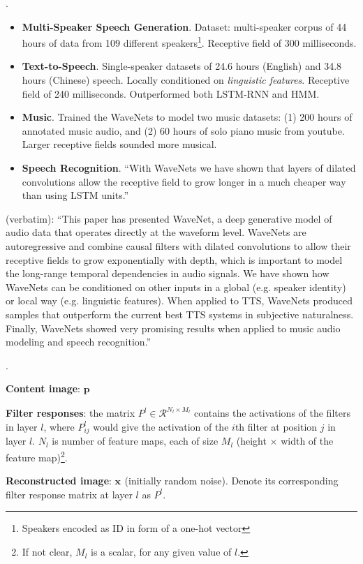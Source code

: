 \documentclass[11pt]{article}
\renewcommand\vec[2][]{\bm{#2}_{#1}}
\newcommand\myspace[1][]{\vspace{#1\bigskipamount}}
\newcommand\p{\Needspace{10\baselineskip} \noindent}
\begin{document}
\myspace
\p {}. 
\begin{itemize}
	\item \textbf{Multi-Speaker Speech Generation}. Dataset: multi-speaker corpus of 44 hours of data from 109 different speakers\footnote{Speakers encoded as ID in form of a one-hot vector}. Receptive field of 300 milliseconds.
	
	
	\item \textbf{Text-to-Speech}. Single-speaker datasets of 24.6 hours (English) and 34.8 hours (Chinese) speech. Locally conditioned on \textit{linguistic features}. Receptive field of 240 milliseconds. Outperformed both LSTM-RNN and HMM.
	
	
	\item \textbf{Music}. Trained the WaveNets to model two music datasets: (1) 200 hours of annotated music audio, and (2) 60 hours of solo piano music from youtube. Larger receptive fields sounded more musical.
	
	\item \textbf{Speech Recognition}. ``With WaveNets we have shown that layers of dilated convolutions allow the receptive field to grow longer in a much cheaper way than using LSTM units.''
\end{itemize}

\myspace
\p {} (verbatim): ``This paper has presented WaveNet, a deep generative model of audio data that operates directly at the waveform level. WaveNets are autoregressive and combine causal filters with dilated convolutions to allow their receptive fields to grow exponentially with depth, which is important to model the long-range temporal dependencies in audio signals. We have shown how WaveNets can be conditioned
on other inputs in a global (e.g. speaker identity) or local way (e.g. linguistic features). When applied to TTS, WaveNets produced samples that outperform the current best TTS systems in subjective naturalness. Finally, WaveNets showed very promising results when applied to music audio modeling and speech recognition.''





\p {}. 
\begin{compactitem}
	\item \textbf{Content image}: $\vec{p}$
	\item \textbf{Filter responses}: the matrix $P^l \in \mathcal{R}^{N_l \times M_l}$ contains the activations of the filters in layer $l$, where $P_{ij}^l$ would give the activation of the $i$th filter at position $j$ in layer $l$. $N_l$ is number of feature maps, each of size $M_l$ (height $\times$ width of the feature map)\footnote{If not clear, $M_l$ is a scalar, for any given value of $l$.}.
	\item \textbf{Reconstructed image}: $\vec{x}$ (initially random noise). Denote its corresponding filter response matrix at layer $l$ as $P^l$. 
\end{compactitem}
\end{document}

